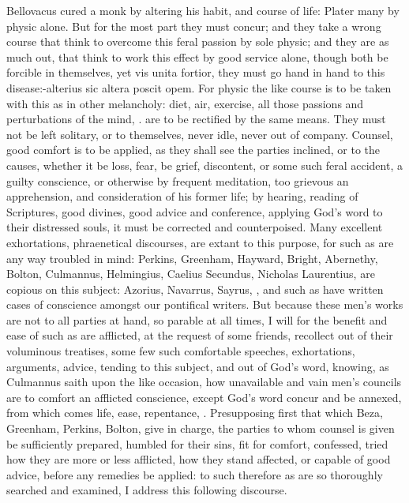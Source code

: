 {Bellovacus cured a monk by altering his habit, and course of
life: Plater many by physic alone. But for the most part they must
concur; and they take a wrong course that think to overcome this feral
passion by sole physic; and they are as much out, that think to work
this effect by good service alone, though both be forcible in
themselves, yet vis unita fortior, they must go hand in hand to this
disease:-alterius sic altera poscit opem. For physic the like course is
to be taken with this as in other melancholy: diet, air, exercise, all
those passions and perturbations of the mind, \etc{}. are to be rectified
by the same means. They must not be left solitary, or to themselves,
never idle, never out of company. Counsel, good comfort is to be
applied, as they shall see the parties inclined, or to the causes,
whether it be loss, fear, be grief, discontent, or some such feral
accident, a guilty conscience, or otherwise by frequent meditation, too
grievous an apprehension, and consideration of his former life; by
hearing, reading of Scriptures, good divines, good advice and
conference, applying God's word to their distressed souls, it must be
corrected and counterpoised. Many excellent exhortations, phraenetical
discourses, are extant to this purpose, for such as are any way
troubled in mind: Perkins, Greenham, Hayward, Bright, Abernethy,
Bolton, Culmannus, Helmingius, Caelius Secundus, Nicholas Laurentius,
are copious on this subject: Azorius, Navarrus, Sayrus, \etc{}, and such
as have written cases of conscience amongst our pontifical writers. But
because these men's works are not to all parties at hand, so parable at
all times, I will for the benefit and ease of such as are afflicted, at
the request of some friends, recollect out of their voluminous
treatises, some few such comfortable speeches, exhortations, arguments,
advice, tending to this subject, and out of God's word, knowing, as
Culmannus saith upon the like occasion, how unavailable and vain
men's councils are to comfort an afflicted conscience, except God's
word concur and be annexed, from which comes life, ease, repentance,
\etc{}. Presupposing first that which Beza, Greenham, Perkins, Bolton, give
in charge, the parties to whom counsel is given be sufficiently
prepared, humbled for their sins, fit for comfort, confessed, tried how
they are more or less afflicted, how they stand affected, or capable of
good advice, before any remedies be applied: to such therefore as are
so thoroughly searched and examined, I address this following
discourse.

}
